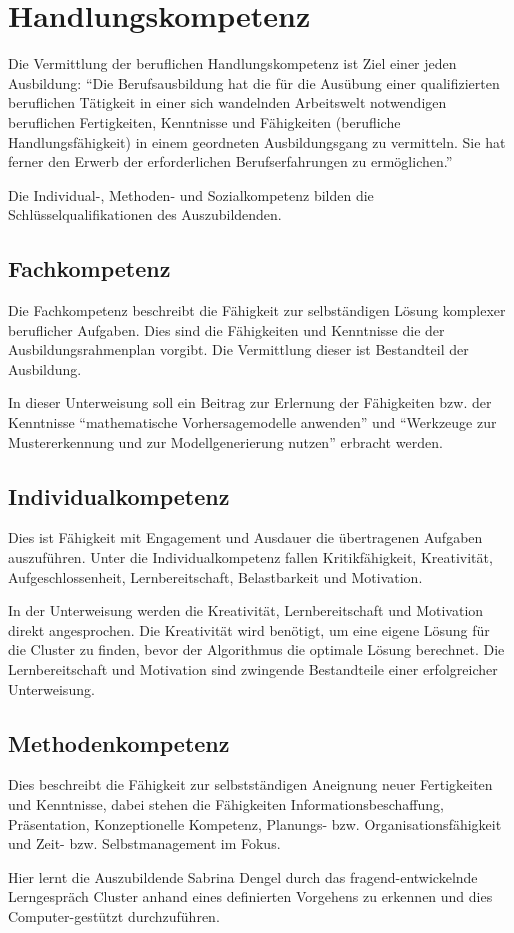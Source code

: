 \chapter{Handlungskompetenz}
Die Vermittlung der beruflichen Handlungskompetenz ist Ziel einer jeden Ausbildung: \enquote{Die Berufsausbildung hat die für die Ausübung einer qualifizierten beruflichen Tätigkeit in einer sich wandelnden Arbeitswelt notwendigen beruflichen Fertigkeiten, Kenntnisse und Fähigkeiten (berufliche Handlungsfähigkeit) in einem geordneten Ausbildungsgang zu vermitteln. Sie hat ferner den Erwerb der erforderlichen Berufserfahrungen zu ermöglichen.}\autocite[][§1\,III BBiG]{berufsbildungsgesetz_bbig_bbig_nodate} 
\par
Die Individual-, Methoden- und Sozialkompetenz bilden die Schlüsselqualifikationen des Auszubildenden. 

\section{Fachkompetenz}
Die Fachkompetenz beschreibt die Fähigkeit zur selbständigen Lösung komplexer beruflicher Aufgaben. Dies sind die Fähigkeiten und Kenntnisse die der Ausbildungsrahmenplan vorgibt. Die Vermittlung dieser ist Bestandteil der Ausbildung. 
\par
In dieser Unterweisung soll ein Beitrag zur Erlernung der Fähigkeiten bzw. der Kenntnisse \enquote{mathematische Vorhersagemodelle anwenden} und \enquote{Werkzeuge zur Mustererkennung und zur Modellgenerierung nutzen} erbracht werden.

\section{Individualkompetenz}
Dies ist Fähigkeit mit Engagement und Ausdauer die übertragenen Aufgaben auszuführen. Unter die Individualkompetenz fallen Kritikfähigkeit, Kreativität, Aufgeschlossenheit,  Lernbereitschaft, Belastbarkeit und Motivation.
\par
In der Unterweisung werden die Kreativität, Lernbereitschaft und Motivation direkt angesprochen. Die Kreativität wird benötigt, um eine eigene Lösung für die Cluster zu finden, bevor der Algorithmus die optimale Lösung berechnet. Die Lernbereitschaft und Motivation sind zwingende Bestandteile einer erfolgreicher Unterweisung. 

\section{Methodenkompetenz}
Dies beschreibt die Fähigkeit zur selbstständigen Aneignung neuer Fertigkeiten und Kenntnisse, dabei stehen die Fähigkeiten Informationsbeschaffung, Präsentation, Konzeptionelle Kompetenz, Planungs- bzw. Organisationsfähigkeit und Zeit- bzw. Selbstmanagement im Fokus.
\par
Hier lernt die Auszubildende Sabrina Dengel durch das fragend-entwickelnde Lerngespräch Cluster anhand eines definierten Vorgehens zu erkennen und dies Computer-gestützt durchzuführen.


